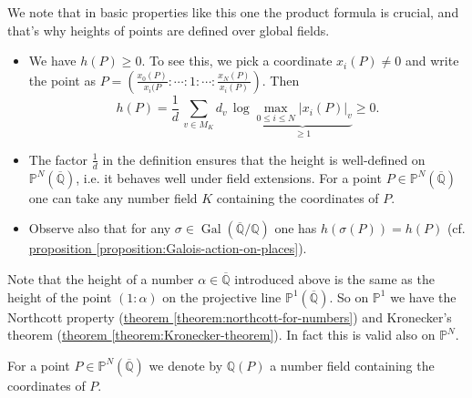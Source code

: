 \documentclass{article}
\newcommand{\refref}[2]{\hyperref[#2]{#1 \ref*{#2}}}
\theoremstyle{definition}
\DeclareMathOperator{\Gal}{Gal}
\newcommand{\QQ}{\mathbb{Q}}
\newcommand{\PP}{\mathbb{P}}
\begin{document}
We note that in basic properties like this one the product formula is crucial,
and that's why heights of points are defined over global fields.

\begin{itemize}
\item We have $h (P) \ge 0$. To see this, we pick a coordinate $x_i (P) \ne 0$
  and write the point as
  $P = \left(\frac{x_0 (P)}{x_i(P} : \cdots : 1 : \cdots : \frac{x_N (P)}{x_i (P)}\right)$.
  Then
  $$h(P) = \frac{1}{d} \, \sum_{v\in M_K} d_v \, \log \underbrace{\max_{0\le i\le N} |x_i (P)|_v}_{\ge 1} \ge 0.$$

\item The factor $\frac{1}{d}$ in the definition ensures that the height is
  well-defined on $\PP^N (\overline{\QQ})$, i.e. it behaves well under field
  extensions. For a point $P \in \PP^N (\overline{\QQ})$ one can take any number
  field $K$ containing the coordinates of $P$.

\item Observe also that for any $\sigma \in \Gal (\overline{\QQ}/\QQ)$ one has
  $h (\sigma (P)) = h (P)$
  (cf. \refref{proposition}{proposition:Galois-action-on-places}).
\end{itemize}

Note that the height of a number $\alpha \in \overline{\QQ}$ introduced above is
the same as the height of the point $(1 : \alpha)$ on the projective line
$\PP^1 (\overline{\QQ})$. So on $\PP^1$ we have the Northcott property
(\refref{theorem}{theorem:northcott-for-numbers}) and Kronecker's theorem
(\refref{theorem}{theorem:Kronecker-theorem}). In fact this is valid also on
$\PP^N$.

For a point $P \in \PP^N (\overline{\QQ})$ we denote by $\QQ (P)$ a number field
containing the coordinates of $P$.
\end{document}
